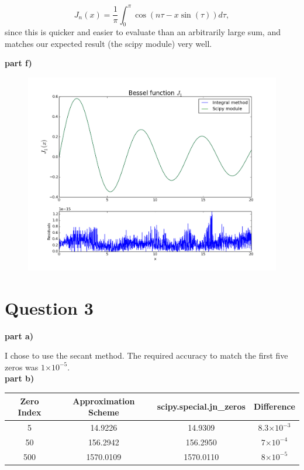 \documentclass[a4paper,12pt]{article}
\providecommand{\e}[1]{\ensuremath{\times 10^{#1}}}
\begin{document}
\begin{equation}
J_n(x) = \frac{1}{\pi}\int_0^{\pi}\cos(n\tau - x\sin(\tau)) d\tau,\nonumber
\end{equation} 
%
since this is quicker and easier to evaluate than an arbitrarily large sum, and matches our expected result (the scipy module) very well.

\textbf{part f)}

\begin{figure}[H]
\centering
\includegraphics[width = 0.8\linewidth]{indepq2f.png}
\caption{}
\label{fig:q2f}
\end{figure}

\section{Question 3}

\textbf{part a)}

I chose to use the secant method. The required accuracy to match the first five zeros was $1\e{-5}$.\\

\textbf{part b)}

\begin{table}[H]
  \centering
  \begin{tabular}{|c||c||c|c|}
    \hline
    Zero Index & Approximation Scheme & scipy.special.jn\_zeros & Difference\\
    \hline
    \hline
    5 & 14.9226 & 14.9309 & $8.3\e{-3}$\\
    \hline
    50 & 156.2942 & 156.2950 & $7\e{-4}$\\
    \hline
    500 & 1570.0109 & 1570.0110 & $8\e{-5}$\\
    \hline
  \end{tabular}
\end{table}
\end{document}
